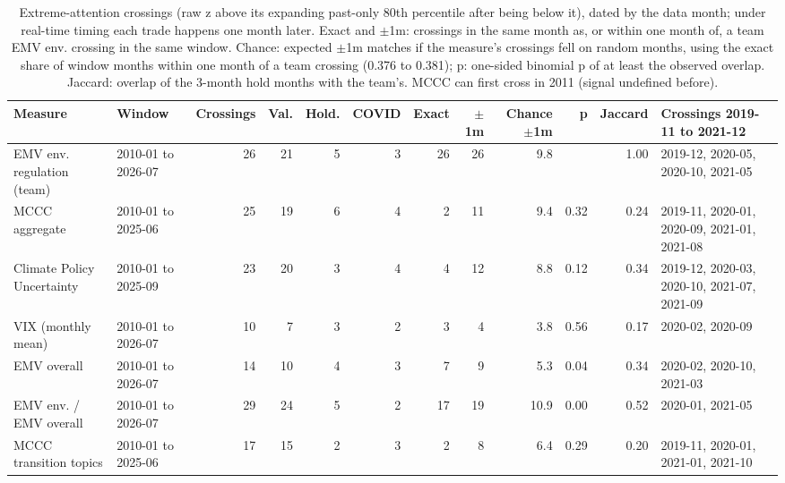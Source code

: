 \begin{table}[htbp]
\centering
\footnotesize
\caption{Extreme-attention crossings (raw z above its expanding past-only 80th percentile after being below it), dated by the data month; under real-time timing each trade happens one month later. Exact and $\pm$1m: crossings in the same month as, or within one month of, a team EMV env. crossing in the same window. Chance: expected $\pm$1m matches if the measure's crossings fell on random months, using the exact share of window months within one month of a team crossing (0.376 to 0.381); p: one-sided binomial p of at least the observed overlap. Jaccard: overlap of the 3-month hold months with the team's. MCCC can first cross in 2011 (signal undefined before).}
\label{tab:m1b_crossings}
\begin{tabular}{llrrrrrrrrrp{3.2cm}}
\toprule
Measure & Window & Crossings & Val. & Hold. & COVID & Exact & $\pm$1m & Chance $\pm$1m & p & Jaccard & Crossings 2019-11 to 2021-12 \\
\midrule
EMV env. regulation (team) & 2010-01 to 2026-07 & 26 & 21 & 5 & 3 & 26 & 26 & 9.8 &  & 1.00 & 2019-12, 2020-05, 2020-10, 2021-05 \\
MCCC aggregate & 2010-01 to 2025-06 & 25 & 19 & 6 & 4 & 2 & 11 & 9.4 & 0.32 & 0.24 & 2019-11, 2020-01, 2020-09, 2021-01, 2021-08 \\
Climate Policy Uncertainty & 2010-01 to 2025-09 & 23 & 20 & 3 & 4 & 4 & 12 & 8.8 & 0.12 & 0.34 & 2019-12, 2020-03, 2020-10, 2021-07, 2021-09 \\
VIX (monthly mean) & 2010-01 to 2026-07 & 10 & 7 & 3 & 2 & 3 & 4 & 3.8 & 0.56 & 0.17 & 2020-02, 2020-09 \\
EMV overall & 2010-01 to 2026-07 & 14 & 10 & 4 & 3 & 7 & 9 & 5.3 & 0.04 & 0.34 & 2020-02, 2020-10, 2021-03 \\
EMV env. / EMV overall & 2010-01 to 2026-07 & 29 & 24 & 5 & 2 & 17 & 19 & 10.9 & 0.00 & 0.52 & 2020-01, 2021-05 \\
MCCC transition topics & 2010-01 to 2025-06 & 17 & 15 & 2 & 3 & 2 & 8 & 6.4 & 0.29 & 0.20 & 2019-11, 2020-01, 2021-01, 2021-10 \\
\bottomrule
\end{tabular}
\end{table}

